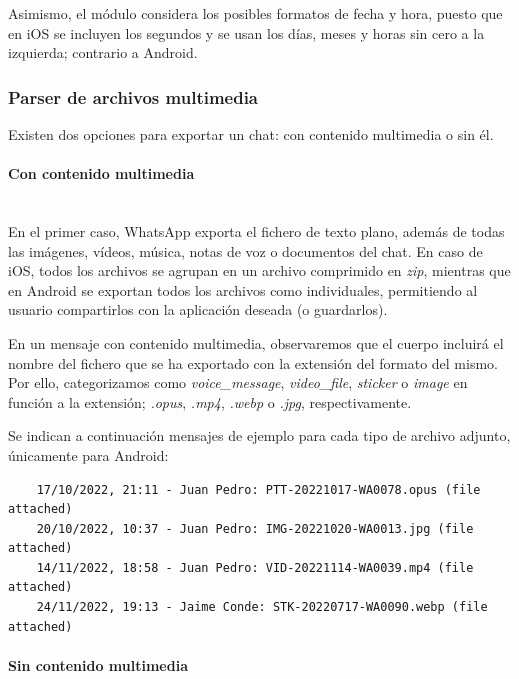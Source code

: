 Asimismo, el módulo considera los posibles formatos de fecha y hora, puesto que en iOS se incluyen los segundos y se usan los días, meses y horas sin cero a la izquierda; contrario a Android.

\subsubsection{Parser de archivos multimedia}

Existen dos opciones para exportar un chat: con contenido multimedia o sin él.

\paragraph{Con contenido multimedia}\mbox{}\\

En el primer caso, WhatsApp exporta el fichero de texto plano, además de todas las imágenes, vídeos, música, notas de voz o documentos del chat. En caso de iOS, todos los archivos se agrupan en un archivo comprimido en \textit{zip}, mientras que en Android se exportan todos los archivos como individuales, permitiendo al usuario compartirlos con la aplicación deseada (o guardarlos).

En un mensaje con contenido multimedia, observaremos que el cuerpo incluirá el nombre del fichero que se ha exportado con la extensión del formato del mismo. Por ello, categorizamos como \textit{voice\_message}, \textit{video\_file}, \textit{sticker} o \textit{image} en función a la extensión; \textit{.opus}, \textit{.mp4}, \textit{.webp} o \textit{.jpg}, respectivamente.

Se indican a continuación mensajes de ejemplo para cada tipo de archivo adjunto, únicamente para Android:

\begin{lstlisting}
	17/10/2022, 21:11 - Juan Pedro: PTT-20221017-WA0078.opus (file attached)
	20/10/2022, 10:37 - Juan Pedro: IMG-20221020-WA0013.jpg (file attached)
	14/11/2022, 18:58 - Juan Pedro: VID-20221114-WA0039.mp4 (file attached)
	24/11/2022, 19:13 - Jaime Conde: STK-20220717-WA0090.webp (file attached)
\end{lstlisting}

\paragraph{Sin contenido multimedia}\mbox{}\\

